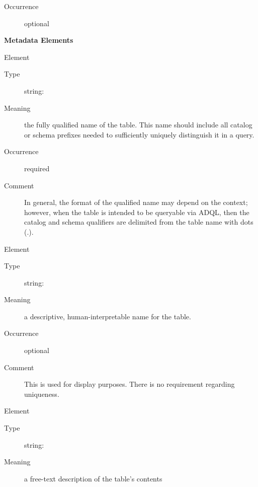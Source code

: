 \documentclass[11pt,a4paper]{ivoa}
\begin{document}
\begin{generated}
\begin{bigdescription}
\begin{description}
\item[Occurrence] optional
\end{description}


\end{bigdescription}\endgroup



\vspace{0.5ex}\noindent\textbf{ Metadata Elements}

\begingroup\small\begin{bigdescription}\item[Element \xmlel{name}]
\begin{description}
\item[Type] string: 
\item[Meaning] 
                  the fully qualified name of the table.  This name 
                  should include all catalog or schema prefixes
                  needed to sufficiently uniquely distinguish it in a
                  query.  
               
\item[Occurrence] required
\item[Comment] 
                  In general, the format of the qualified name may
                  depend on the context; however, when the
                  table is intended to be queryable via ADQL, then the
                  catalog and schema qualifiers are delimited from the
                  table name with dots (.).  
               

\end{description}
\item[Element \xmlel{title}]
\begin{description}
\item[Type] string: 
\item[Meaning] 
                  a descriptive, human-interpretable name for the table.
               
\item[Occurrence] optional
\item[Comment] 
                  This is used for display purposes.  There is no requirement
                  regarding uniqueness.  
               

\end{description}
\item[Element \xmlel{description}]
\begin{description}
\item[Type] string: 
\item[Meaning] 
                  a free-text description of the table's contents
               

\end{description}
\end{bigdescription}
\end{generated}
\end{document}
